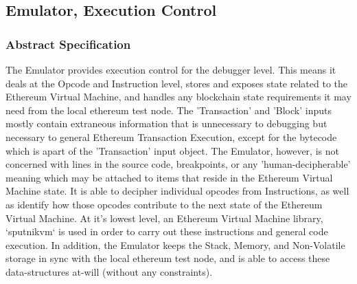 \documentclass{report}
\begin{document}
\subsection{Emulator, Execution Control}

    \subsubsection{Abstract Specification}
        The Emulator provides execution control for the debugger level. This means it deals at the Opcode and Instruction level, stores and exposes state related to the Ethereum Virtual Machine, and handles any blockchain state requirements it may need from the local ethereum test node. The 'Transaction' and 'Block' inputs mostly contain extraneous information that is unnecessary to debugging but necessary to general Ethereum Transaction Execution, except for the bytecode which is apart of the 'Transaction' input object. The Emulator, however, is not concerned with lines in the source code, breakpoints, or any 'human-decipherable' meaning which may be attached to items that reside in the Ethereum Virtual Machine state. It is able to decipher individual opcodes from Instructions, as well as identify how those opcodes contribute to the next state of the Ethereum Virtual Machine. At it's lowest level, an Ethereum Virtual Machine library, `sputnikvm` is used in order to carry out these instructions and general code execution. In addition, the Emulator keeps the Stack, Memory, and Non-Volatile storage in sync with the local ethereum test node, and is able to access these data-structures at-will (without any constraints).
\end{document}
